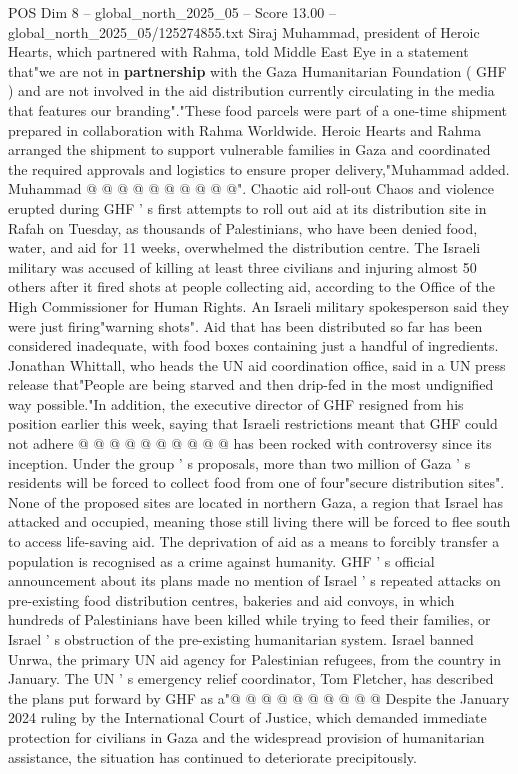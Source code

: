 \begin{textsample}{POS Dim 8 – global\_north\_2025\_05 – Score 13.00 – global\_north\_2025\_05/125274855.txt}
Siraj Muhammad, president of Heroic Hearts, which partnered with Rahma, told Middle East Eye in a statement that"we are not in \textbf{partnership} with the Gaza Humanitarian Foundation ( GHF ) and are not involved in the aid distribution currently circulating in the media that features our branding"."These food parcels were part of a one-time shipment prepared in collaboration with Rahma Worldwide.
Heroic Hearts and Rahma arranged the shipment to support vulnerable families in Gaza and coordinated the required approvals and logistics to ensure proper delivery,"Muhammad added.
Muhammad @ @ @ @ @ @ @ @ @ @".
Chaotic aid roll-out Chaos and violence erupted during GHF ' s first attempts to roll out aid at its distribution site in Rafah on Tuesday, as thousands of Palestinians, who have been denied food, water, and aid for 11 weeks, overwhelmed the distribution centre.
The Israeli military was accused of killing at least three civilians and injuring almost 50 others after it fired shots at people collecting aid, according to the Office of the High Commissioner for Human Rights.
An Israeli military spokesperson said they were just firing"warning shots".
Aid that has been distributed so far has been considered inadequate, with food boxes containing just a handful of ingredients.
Jonathan Whittall, who heads the UN aid coordination office, said in a UN press release that"People are being starved and then drip-fed in the most undignified way possible."In addition, the executive director of GHF resigned from his position earlier this week, saying that Israeli restrictions meant that GHF could not adhere @ @ @ @ @ @ @ @ @ @ has been rocked with controversy since its inception.
Under the group ' s proposals, more than two million of Gaza ' s residents will be forced to collect food from one of four"secure distribution sites".
None of the proposed sites are located in northern Gaza, a region that Israel has attacked and occupied, meaning those still living there will be forced to flee south to access life-saving aid.
The deprivation of aid as a means to forcibly transfer a population is recognised as a crime against humanity.
GHF ' s official announcement about its plans made no mention of Israel ' s repeated attacks on pre-existing food distribution centres, bakeries and aid convoys, in which hundreds of Palestinians have been killed while trying to feed their families, or Israel ' s obstruction of the pre-existing humanitarian system.
Israel banned Unrwa, the primary UN aid agency for Palestinian refugees, from the country in January.
The UN ' s emergency relief coordinator, Tom Fletcher, has described the plans put forward by GHF as a"@ @ @ @ @ @ @ @ @ @ Despite the January 2024 ruling by the International Court of Justice, which demanded immediate protection for civilians in Gaza and the widespread provision of humanitarian assistance, the situation has continued to deteriorate precipitously.

\end{textsample}
